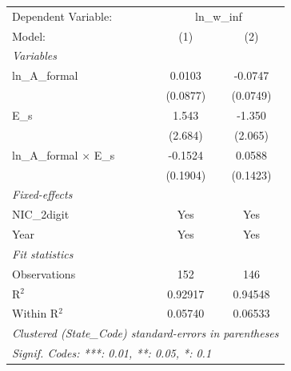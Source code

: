 
\begingroup
\centering
\begin{tabular}{lcc}
   \tabularnewline \midrule \midrule
   Dependent Variable: & \multicolumn{2}{c}{ln\_w\_inf}\\
   Model:                          & (1)      & (2)\\  
   \midrule
   \emph{Variables}\\
   ln\_A\_formal                   & 0.0103   & -0.0747\\   
                                   & (0.0877) & (0.0749)\\   
   E\_s                            & 1.543    & -1.350\\   
                                   & (2.684)  & (2.065)\\   
   ln\_A\_formal $\times$ E\_s     & -0.1524  & 0.0588\\   
                                   & (0.1904) & (0.1423)\\   
   \midrule
   \emph{Fixed-effects}\\
   NIC\_2digit                     & Yes      & Yes\\  
   Year                            & Yes      & Yes\\  
   \midrule
   \emph{Fit statistics}\\
   Observations                    & 152      & 146\\  
   R$^2$                           & 0.92917  & 0.94548\\  
   Within R$^2$                    & 0.05740  & 0.06533\\  
   \midrule \midrule
   \multicolumn{3}{l}{\emph{Clustered (State\_Code) standard-errors in parentheses}}\\
   \multicolumn{3}{l}{\emph{Signif. Codes: ***: 0.01, **: 0.05, *: 0.1}}\\
\end{tabular}
\par\endgroup


